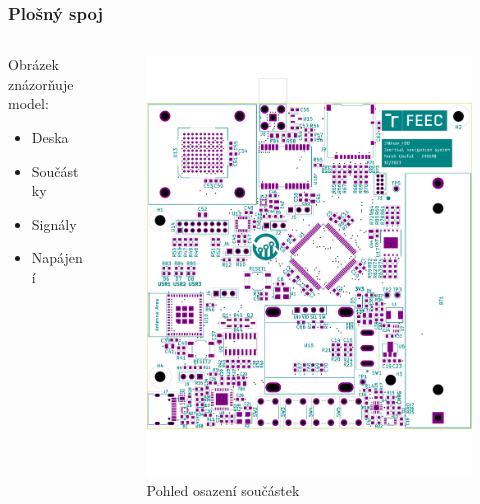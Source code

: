 \documentclass[%
  12pt,       				%
	t,                  %
	aspectratio=1610,   %
	unicode,						%
]{beamer}				    	%
\begin{document}
\begin{frame} 
	\frametitle{Plošný spoj}
	
	\begin{columns}[T] 								%
		\begin{column}{0.3\textwidth}		%
			Obrázek znázorňuje model:\\[2ex]
			\begin{itemize}
				\item Deska
				\item Součástky
				\item Signály
				\item Napájení
			\end{itemize}
		\end{column}
		\begin{column}{0.7\textwidth}		%
			\begin{figure}%
				\centering
			    \includegraphics[width=0.6\columnwidth, trim={0 3.2cm 0 1.5cm},clip]{KiCad/boardTopParts}
				\caption{Pohled osazení součástek}%
			\end{figure}
		\end{column}
	\end{columns}											%
\end{frame}
\end{document}
